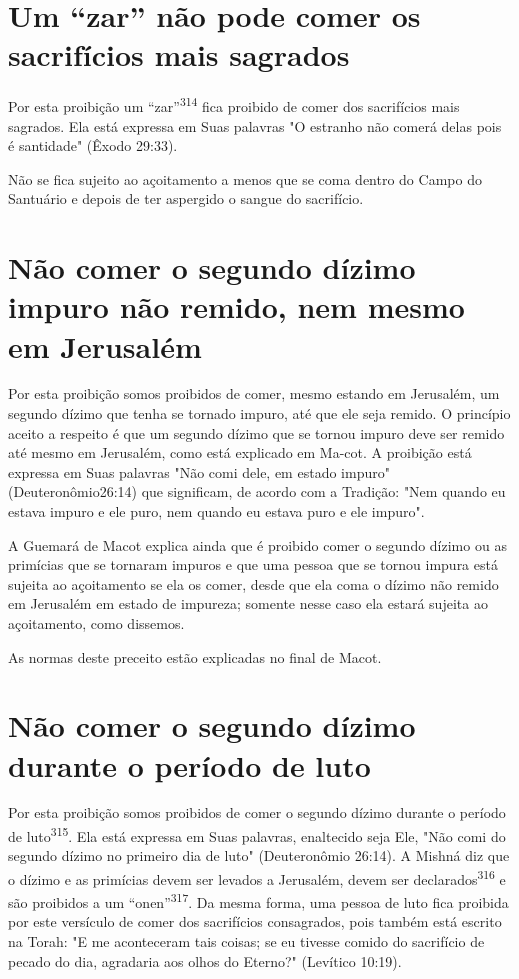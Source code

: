 \section{Um ``zar'' não pode comer os sacrifícios mais sagrados}

Por esta proibição um ``zar''\textsuperscript{314} fica proibido de comer
dos sacrifí­cios mais sagrados. Ela está expressa em Suas palavras "O
estranho não comerá delas pois é santidade" (Êxodo 29:33).

Não se fica sujeito ao açoitamento a menos que se coma dentro do Campo
do Santuário e depois de ter aspergido o sangue do sacrifício.

\section{Não comer o segundo dízimo impuro não remido, nem mesmo em Jerusalém}

Por esta proibição somos proibidos de comer, mesmo estando em Jerusalém,
um segundo dízimo que tenha se tornado impuro, até que ele seja remido.
O princípio aceito a respeito é que um segundo dízimo que se tornou
impuro deve ser remido até mesmo em Jerusalém, como está explicado em
Ma-cot. A proibição está expressa em Suas palavras "Não comi dele, em
estado im­puro" (Deuteronômio26:14) que significam, de acordo com a
Tradição: "Nem quando eu estava impuro e ele puro, nem quando eu estava
puro e ele impuro".

A Guemará de Macot explica ainda que é proibido comer o segundo dízimo
ou as primícias que se tornaram impuros e que uma pessoa que se tor­nou
impura está sujeita ao açoitamento se ela os comer, desde que ela coma o
dízimo não remido em Jerusalém em estado de impureza; somente nesse
ca­so ela estará sujeita ao açoitamento, como dissemos.

As normas deste preceito estão explicadas no final de Macot.

\section{Não comer o segundo dízimo durante o período de luto}

Por esta proibição somos proibidos de comer o segundo dízimo du­rante o
período de luto\textsuperscript{315}. Ela está expressa em Suas
palavras, enaltecido seja Ele, "Não comi do segundo dízimo no primeiro
dia de luto" (Deuteronômio 26:14). A Mishná diz que o dízimo e as
primícias devem ser levados a Jerusa­lém, devem ser
declarados\textsuperscript{316} e são proibidos a um
``onen''\textsuperscript{317}. Da mesma for­ma, uma pessoa de luto fica
proibida por este versículo de comer dos sacrifí­cios consagrados, pois
também está escrito na Torah: "E me aconteceram tais coisas; se eu
tivesse comido do sacrifício de pecado do dia, agradaria aos olhos do
Eterno?" (Levítico 10:19).

